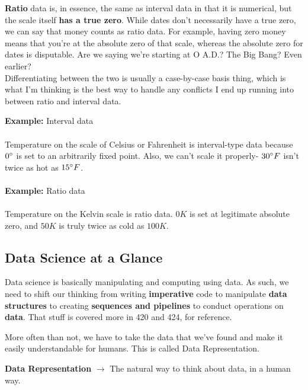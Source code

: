 \documentclass[english, 10pt]{article}
\begin{document}
\textbf{Ratio} data is, in essence, the same as interval data in that it is numerical, but the scale itself \textbf{has a true zero}. While dates don't necessarily have a true zero, we can say that money counts as ratio data. For example, having zero money means that you're at the absolute zero of that scale, whereas the absolute zero for dates is disputable. Are we saying we're starting at O A.D.? The Big Bang? Even earlier?\\

Differentiating between the two is usually a case-by-case basis thing, which is what I'm thinking is the best way to handle any conflicts I end up running into between ratio and interval data.\\

\begin{myproof}
\textbf{Example:} Interval data \\\\
Temperature on the scale of Celsius or Fahrenheit is interval-type data because $0\degree$ is set to an arbitrarily fixed point. Also, we can't scale it properly- $30\degree F$ isn't twice as hot as $15\degree F$.\\\\
\textbf{Example:} Ratio data \\\\
Temperature on the Kelvin scale is ratio data. $0K$ is set at legitimate absolute zero, and $50K$ is truly twice as cold as $100K$.
\end{myproof}

\subsection{Data Science at a Glance}

Data science is basically manipulating and computing using data. As such, we need to shift our thinking from writing \textbf{imperative} code to manipulate \textbf{data structures} to creating \textbf{sequences and pipelines} to conduct operations on \textbf{data}. That stuff is covered more in 420 and 424, for reference.\newline

More often than not, we have to take the data that we've found and make it easily understandable for humans. This is called Data Representation.\newline

\begin{tcolorbox}[title=Definition:,colframe=red!75!black,colback=red!5!white,arc=0pt,fonttitle=\bfseries]
\textbf{Data Representation} $\rightarrow$ The natural way to think about data, in a human way.
\end{tcolorbox}
\end{document}
